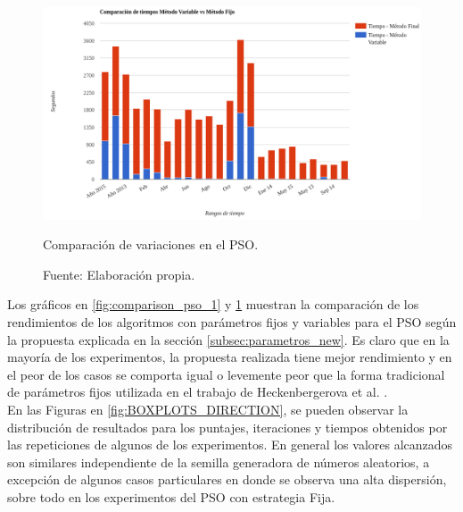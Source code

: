 \begin{figure}[ht!]
    \centering
    \captionsetup{justification=centering,margin=2cm}
        \includegraphics[width=\textwidth]{figures/comp_v1_v2_tiempo.png}   
    \caption{Comparación de variaciones en el PSO.}
    \caption*{Fuente: Elaboración propia.}
    \label{fig:comparison_pso_2}
\end{figure}
Los gráficos en \ref{fig:comparison_pso_1} y  \ref{fig:comparison_pso_2} muestran la comparación de los rendimientos de los algoritmos con parámetros fijos y variables para el PSO según la propuesta explicada en la sección \ref{subsec:parametros_new}. Es claro que en la mayoría de los experimentos, la propuesta realizada tiene mejor rendimiento y en el peor de los casos se comporta igual o levemente peor que la forma tradicional de parámetros fijos utilizada en el trabajo de Heckenbergerova et al. \cite{Heckenbergerova15}.\\
En las Figuras en \ref{fig:BOXPLOTS_DIRECTION}, se pueden observar la distribución de resultados para los puntajes, iteraciones y tiempos obtenidos por las repeticiones de algunos de los experimentos. En general los valores alcanzados son similares independiente de la semilla generadora de números aleatorios, a excepción de algunos casos particulares en donde se observa una alta dispersión, sobre todo en los experimentos del PSO con estrategia Fija.

